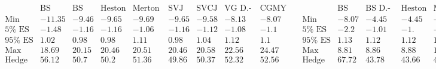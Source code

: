 \documentclass{article}
\begin{document}
\[\begin{array}{ccc}
\begin{array}{rrrrrrrrr}
 \text{} & \text{BS Delta} & \text{BS D.-Vega} & \text{Heston D.-Vega} & \text{Merton D.-Gamma} & \text{SVJ D.-Vega} & \text{SVCJ D.-Vega} & \text{VG
D.-Gamma} & \text{CGMY D.-Gamma} \\
 \text{Min} & -11.35 & -9.46 & -9.65 & -9.69 & -9.65 & -9.58 & -8.13 & -8.07 \\
 \text{5$\%$ ES} & -1.48 & -1.16 & -1.16 & -1.06 & -1.16 & -1.12 & -1.08 & -1.1 \\
 \text{95$\%$ ES} & 1.02 & 0.98 & 0.98 & 1.11 & 0.98 & 1.04 & 1.12 & 1.1 \\
 \text{Max} & 18.69 & 20.15 & 20.46 & 20.51 & 20.46 & 20.58 & 22.56 & 24.47 \\
 \text{Hedge error} & 56.12 & 50.7 & 50.2 & 51.36 & 49.86 & 50.37 & 52.32 & 52.56 \\
\end{array}
 & 
\begin{array}{rrrrrrrrr}
 \text{} & \text{BS Delta} & \text{BS D.-Gamma} & \text{Heston D.-Vega} & \text{Merton D.-Gamma} & \text{SVJ D.-Vega} & \text{SVCJ D.-Vega} & \text{VG
D.-Gamma} & \text{CGMY D.-Gamma} \\
 \text{Min} & -8.07 & -4.45 & -4.45 & -5.07 & -4.45 & -4.46 & -5.04 & -6.24 \\
 \text{5$\%$ ES} & -2.2 & -1.01 & -1. & -1.01 & -0.96 & -1.01 & -1.19 & -1.14 \\
 \text{95$\%$ ES} & 1.13 & 1.12 & 1.12 & 1.13 & 1.09 & 1.13 & 1.15 & 1.17 \\
 \text{Max} & 8.81 & 8.86 & 8.88 & 12.07 & 8.88 & 9.69 & 8.73 & 9.95 \\
 \text{Hedge error} & 67.72 & 43.78 & 43.66 & 44.58 & 42.29 & 44.34 & 48.69 & 48.24 \\
\end{array}
 & 
\begin{array}{rrrrrrrrr}
 \text{} & \text{BS Delta} & \text{BS D.-Gamma} & \text{Heston D.-Vega} & \text{Merton D.-Gamma} & \text{SVJ D.-Gamma} & \text{SVCJ D.-Gamma} & \text{VG
D.-Gamma} & \text{CGMY D.-Gamma} \\
 \text{Min} & -16.51 & -10.93 & -10.88 & -14.36 & -14.92 & -29.05 & -24.66 & -17.07 \\
 \text{5$\%$ ES} & -3.13 & -1.64 & -1.72 & -1.76 & -1.76 & -1.84 & -1.85 & -1.75 \\
 \text{95$\%$ ES} & 1.08 & 0.98 & 1.01 & 1.09 & 1.08 & 1.11 & 1. & 1.06 \\
 \text{Max} & 7.74 & 8.92 & 7. & 21.48 & 14.13 & 20.24 & 11.11 & 11.54 \\
 \text{Hedge error} & 88.09 & 56.03 & 57.62 & 60.19 & 60.53 & 63.85 & 61.3 & 58.33 \\
\end{array}
 \\
\end{array}\]
\end{document}
